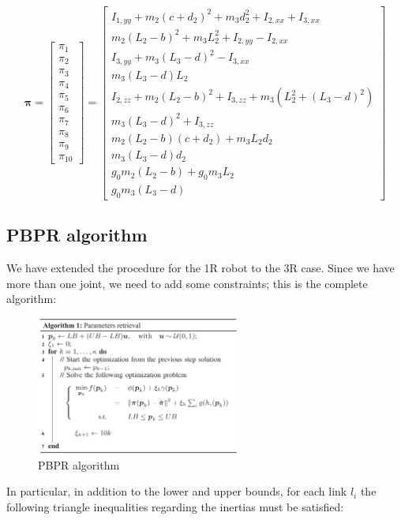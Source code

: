 \documentclass{article}
\begin{document}
\[\bm{\pi}= \begin{bmatrix}
\pi_1 \\ \pi_2 \\ \pi_3 \\ \pi_4 \\ \pi_5 \\ \pi_6 \\ \pi_7 \\ \pi_8 \\ \pi_9 \\ \pi_{10}
\end{bmatrix} = \begin{bmatrix}
I_{1,yy} + m_2 (c+ d_2)^2 + m_3 d_2^2 + I_{2,xx} + I_{3,xx}\\
m_2(L_2 -b)^2 + m_3 L_2^2 + I_{2,yy} - I_{2,xx}\\
I_{3,yy} + m_3(L_3 - d)^2 - I_{3,xx}\\
m_3(L_3 -d)L_2\\
I_{2,zz} + m_2(L_2 - b)^2 + I_{3,zz} + m_3(L_2^2 + (L_3 - d)^2 )\\
m_3(L_3 -d)^2 + I_{3,zz}\\
m_2(L_2 - b)(c+ d_2) + m_3 L_2 d_2\\
m_3(L_3 - d)d_2\\
g_0 m_2 (L_2 - b) + g_0 m_3 L_2\\
g_0 m_3 (L_3 - d)
\end{bmatrix}\]

\subsection{PBPR algorithm}
We have extended the procedure for the 1R robot to the 3R case. Since we have more than one joint, we need to add some constraints; this is the complete algorithm:
\FloatBarrier
\begin{figure}[!htbp]
\centering
\includegraphics[width=0.6\textwidth]{images/3-dof/algorithm.png}
\caption{PBPR algorithm}
\end{figure}
\FloatBarrier
In particular, in addition to the lower and upper bounds, for each link $l_i$ the following triangle inequalities regarding the inertias must be satisfied:
\end{document}
